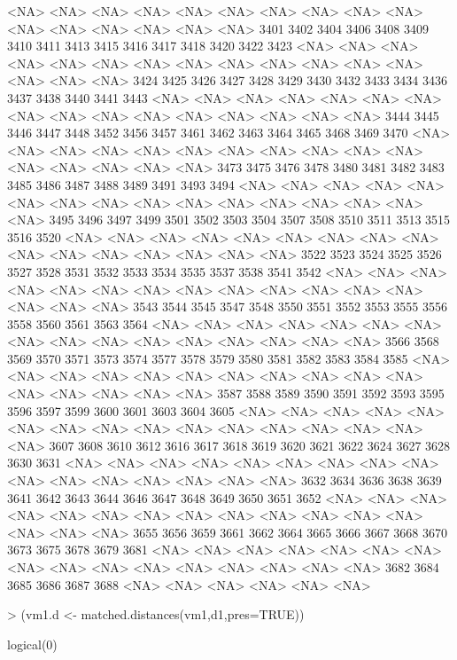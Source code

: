 \documentclass{article}
\begin{document}
\begin{Schunk}
\begin{Soutput}
<NA> <NA> <NA> <NA> <NA> <NA> <NA> <NA> <NA> <NA> <NA> <NA> <NA> <NA> <NA> <NA> 
3401 3402 3404 3406 3408 3409 3410 3411 3413 3415 3416 3417 3418 3420 3422 3423 
<NA> <NA> <NA> <NA> <NA> <NA> <NA> <NA> <NA> <NA> <NA> <NA> <NA> <NA> <NA> <NA> 
3424 3425 3426 3427 3428 3429 3430 3432 3433 3434 3436 3437 3438 3440 3441 3443 
<NA> <NA> <NA> <NA> <NA> <NA> <NA> <NA> <NA> <NA> <NA> <NA> <NA> <NA> <NA> <NA> 
3444 3445 3446 3447 3448 3452 3456 3457 3461 3462 3463 3464 3465 3468 3469 3470 
<NA> <NA> <NA> <NA> <NA> <NA> <NA> <NA> <NA> <NA> <NA> <NA> <NA> <NA> <NA> <NA> 
3473 3475 3476 3478 3480 3481 3482 3483 3485 3486 3487 3488 3489 3491 3493 3494 
<NA> <NA> <NA> <NA> <NA> <NA> <NA> <NA> <NA> <NA> <NA> <NA> <NA> <NA> <NA> <NA> 
3495 3496 3497 3499 3501 3502 3503 3504 3507 3508 3510 3511 3513 3515 3516 3520 
<NA> <NA> <NA> <NA> <NA> <NA> <NA> <NA> <NA> <NA> <NA> <NA> <NA> <NA> <NA> <NA> 
3522 3523 3524 3525 3526 3527 3528 3531 3532 3533 3534 3535 3537 3538 3541 3542 
<NA> <NA> <NA> <NA> <NA> <NA> <NA> <NA> <NA> <NA> <NA> <NA> <NA> <NA> <NA> <NA> 
3543 3544 3545 3547 3548 3550 3551 3552 3553 3555 3556 3558 3560 3561 3563 3564 
<NA> <NA> <NA> <NA> <NA> <NA> <NA> <NA> <NA> <NA> <NA> <NA> <NA> <NA> <NA> <NA> 
3566 3568 3569 3570 3571 3573 3574 3577 3578 3579 3580 3581 3582 3583 3584 3585 
<NA> <NA> <NA> <NA> <NA> <NA> <NA> <NA> <NA> <NA> <NA> <NA> <NA> <NA> <NA> <NA> 
3587 3588 3589 3590 3591 3592 3593 3595 3596 3597 3599 3600 3601 3603 3604 3605 
<NA> <NA> <NA> <NA> <NA> <NA> <NA> <NA> <NA> <NA> <NA> <NA> <NA> <NA> <NA> <NA> 
3607 3608 3610 3612 3616 3617 3618 3619 3620 3621 3622 3624 3627 3628 3630 3631 
<NA> <NA> <NA> <NA> <NA> <NA> <NA> <NA> <NA> <NA> <NA> <NA> <NA> <NA> <NA> <NA> 
3632 3634 3636 3638 3639 3641 3642 3643 3644 3646 3647 3648 3649 3650 3651 3652 
<NA> <NA> <NA> <NA> <NA> <NA> <NA> <NA> <NA> <NA> <NA> <NA> <NA> <NA> <NA> <NA> 
3655 3656 3659 3661 3662 3664 3665 3666 3667 3668 3670 3673 3675 3678 3679 3681 
<NA> <NA> <NA> <NA> <NA> <NA> <NA> <NA> <NA> <NA> <NA> <NA> <NA> <NA> <NA> <NA> 
3682 3684 3685 3686 3687 3688 
<NA> <NA> <NA> <NA> <NA> <NA> 
\end{Soutput}
\end{Schunk}

\begin{Schunk}
\begin{Sinput}
> (vm1.d <- matched.distances(vm1,d1,pres=TRUE))
\end{Sinput}
\begin{Soutput}
logical(0)
\end{Soutput}
\end{Schunk}
\end{document}
